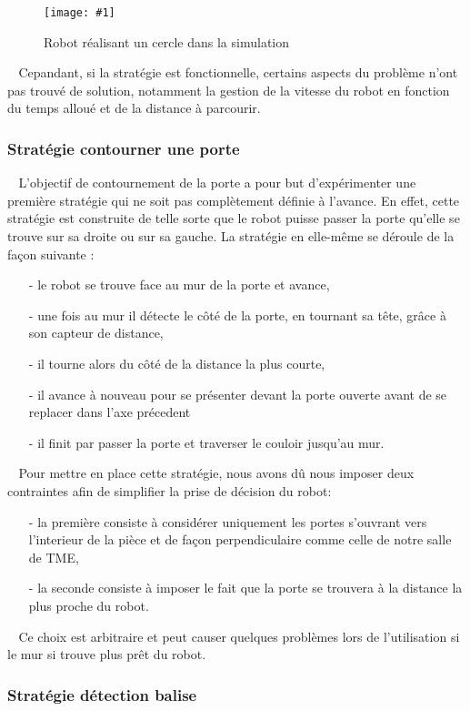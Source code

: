 \documentclass[12pt]{article}
\def\tab{$\>\>\>\>$}
\newcommand\img[2]{
\begin{figure}[!h]
  \centering
    \texttt{[image: \#1]}
  \caption{#2}
  \label{img:#1}
\end{figure}
}
\begin{document}
\img{Images/Cercle.png}{Robot réalisant un cercle dans la simulation}

\tab Cepandant, si la stratégie est fonctionnelle, certains aspects du problème n'ont pas trouvé de solution, notamment la gestion de la vitesse du robot en fonction du temps alloué et de la distance à parcourir.

\subsubsection{Stratégie contourner une porte}
\tab L'objectif de contournement de la porte a pour but d'expérimenter une première stratégie qui ne soit pas complètement définie à l'avance. En effet, cette stratégie est construite de telle sorte que le robot puisse passer la porte qu'elle se trouve sur sa droite ou sur sa gauche. La stratégie en elle-même se déroule de la façon suivante : \begin{itemize}
\item[-] le robot se trouve face au mur de la porte et avance,
\item[-] une fois au mur il détecte le côté de la porte, en tournant sa tête, grâce à son capteur de distance,
\item[-] il tourne alors du côté de la distance la plus courte,
\item[-] il avance à nouveau pour se présenter devant la porte ouverte avant de se replacer dans l'axe précedent
\item[-] il finit par passer la porte et traverser le couloir jusqu'au mur.
\end{itemize}
\tab Pour mettre en place cette stratégie, nous avons dû nous imposer deux contraintes afin de simplifier la prise de décision du robot:\begin{itemize}
\item[-] la première consiste à considérer uniquement les portes s'ouvrant vers l'interieur de la pièce et de façon perpendiculaire comme celle de notre salle de TME,
\item[-] la seconde consiste à imposer le fait que la porte se trouvera à la distance la plus proche du robot.
\end{itemize}
\tab Ce choix est arbitraire et peut causer quelques problèmes lors de l'utilisation si le mur si trouve plus prêt du robot.

\newpage
\subsubsection{Stratégie détection balise}
\end{document}
